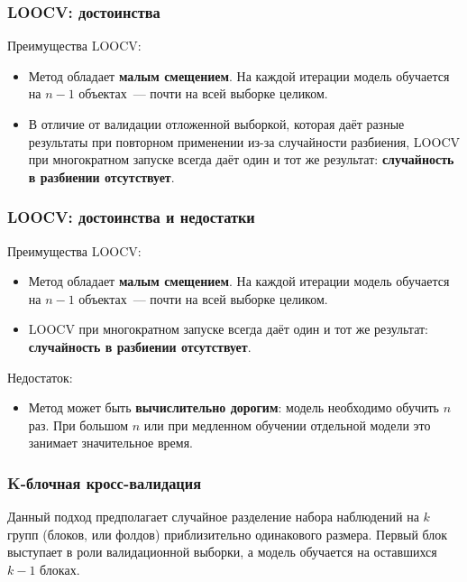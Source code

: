 \documentclass{beamer}
\begin{document}
\begin{frame}
  \frametitle{LOOCV: достоинства}

  Преимущества LOOCV:

  \begin{itemize}
    \item Метод обладает \textbf{малым смещением}. На каждой итерации модель обучается на $n - 1$ объектах~--- почти на всей выборке целиком.

    \item В отличие от валидации отложенной выборкой, которая даёт разные результаты при повторном применении из-за случайности разбиения, LOOCV при многократном запуске всегда даёт один и тот же результат: \textbf{случайность в разбиении отсутствует}.
  \end{itemize}

\end{frame}

\begin{frame}
  \frametitle{LOOCV: достоинства и недостатки}

  Преимущества LOOCV:

  \begin{itemize}
    \item Метод обладает \textbf{малым смещением}. На каждой итерации модель обучается на $n - 1$ объектах~--- почти на всей выборке целиком.

    \item LOOCV при многократном запуске всегда даёт один и тот же результат: \textbf{случайность в разбиении отсутствует}.
  \end{itemize}

  Недостаток:

  \begin{itemize}
    \item Метод может быть \textbf{вычислительно дорогим}: модель необходимо обучить $n$ раз. При большом $n$ или при медленном обучении отдельной модели это занимает значительное время.
  \end{itemize}

\end{frame}


\begin{frame}
  \frametitle{K-блочная кросс-валидация}

  Данный подход предполагает случайное разделение набора наблюдений на $k$ групп (блоков, или фолдов) приблизительно одинакового размера. Первый блок выступает в роли валидационной выборки, а модель обучается на оставшихся $k - 1$ блоках.

\end{frame}
\end{document}
